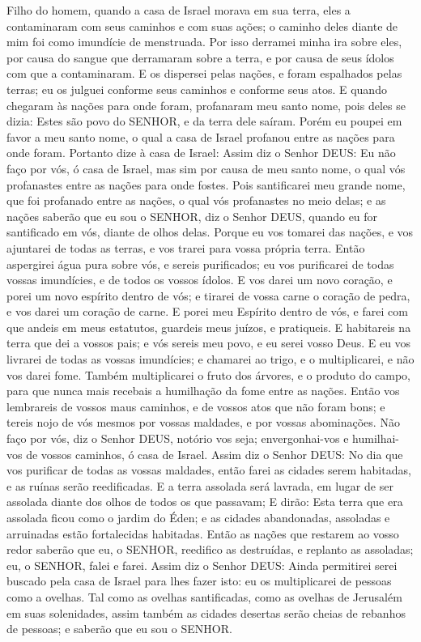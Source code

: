 {Filho do homem, quando a casa de Israel morava em sua terra, eles a contaminaram com seus caminhos e com suas ações; o caminho deles diante de mim foi como imundície de menstruada.
Por isso derramei minha ira sobre eles, por causa do sangue que derramaram sobre a terra, e por causa de seus ídolos com que a contaminaram.
E os dispersei pelas nações, e foram espalhados pelas terras; eu os julguei conforme seus caminhos e conforme seus atos.
E quando chegaram às nações para onde foram, profanaram meu santo nome, pois deles se dizia: Estes são povo do SENHOR, e da terra dele saíram.
Porém eu
{} poupei em favor a meu santo nome, o qual a casa de Israel profanou entre as nações para onde foram.
Portanto dize à casa de Israel: Assim diz o Senhor DEUS: Eu não faço
{} por vós, ó casa de Israel, mas sim por causa de meu santo nome, o qual vós profanastes entre as nações para onde fostes.
Pois santificarei meu grande nome, que foi profanado entre as nações, o qual vós profanastes no meio delas; e as nações saberão que eu sou o SENHOR, diz o Senhor DEUS, quando eu for santificado em vós, diante de olhos delas.
Porque eu vos tomarei das nações, e vos ajuntarei de todas as terras, e vos trarei para vossa própria terra.
Então aspergirei água pura sobre vós, e sereis purificados; eu vos purificarei de todas vossas imundícies, e de todos os vossos ídolos.
E vos darei um novo coração, e porei um novo espírito dentro de vós; e tirarei de vossa carne o coração de pedra, e vos darei um coração de carne.
E porei meu Espírito dentro de vós, e farei com que andeis em meus estatutos, guardeis meus juízos, e
{} pratiqueis.
E habitareis na terra que dei a vossos pais; e vós sereis meu povo, e eu serei vosso Deus.
E eu vos livrarei de todas as vossas imundícies; e chamarei ao trigo, e o multiplicarei, e não vos darei fome.
Também multiplicarei o fruto dos árvores, e o produto do campo, para que nunca mais recebais a humilhação da fome entre as nações.
Então vos lembrareis de vossos maus caminhos, e de vossos atos que não foram bons; e tereis nojo de vós mesmos por vossas maldades, e por vossas abominações.
Não faço
{} por vós, diz o Senhor DEUS, notório vos seja; envergonhai-vos e humilhai-vos de vossos caminhos, ó casa de Israel.
Assim diz o Senhor DEUS: No dia que vos purificar de todas as vossas maldades, então farei as cidades serem habitadas, e as ruínas serão reedificadas.
E a terra assolada será lavrada, em lugar de ser assolada diante dos olhos de todos os que passavam;
E dirão: Esta terra que era assolada ficou como o jardim do Éden; e as cidades abandonadas, assoladas e arruinadas estão fortalecidas
{} habitadas.
Então as nações que restarem ao vosso redor saberão que eu, o SENHOR, reedifico as
{} destruídas, e replanto as assoladas; eu, o SENHOR, falei e farei.
Assim diz o Senhor DEUS: Ainda permitirei serei buscado pela casa de Israel para lhes fazer isto: eu os multiplicarei de pessoas como a ovelhas.
Tal como as ovelhas santificadas, como as ovelhas de Jerusalém em suas solenidades, assim também as cidades desertas serão cheias de rebanhos de pessoas; e saberão que eu sou o SENHOR.

}
